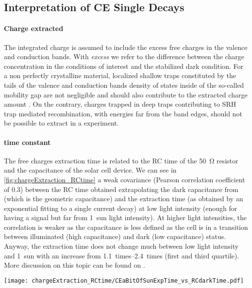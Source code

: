 	\subsection{Interpretation of CE Single Decays}

		\paragraph{Charge extracted}
		The integrated charge is assumed to include the excess free charges in the valence and conduction bands.
		With \emph{excess} we refer to the difference between the charge concentration in the conditions of interest and the stabilized dark condition.
		For a non perfectly crystalline material, localized shallow traps constituted by the tails of the valence and conduction bands density of states inside of the so\hyp{}called mobility gap \cite{Pieters2009} are not negligible and should also contribute to the extracted charge amount \cite{Kirchartz2012,Du2018}.
		On the contrary, charges trapped in deep traps contributing to SRH trap mediated recombination, with energies far from the band edges, should not be possible to extract in a  experiment.

		\paragraph{ time constant}
		The free charges extraction time is related to the RC time of the \SI{50}{\ohm} resistor and the capacitance of the solar cell device.
		We can see in \cref{fig:chargeExtraction_RCtime} a weak covariance (Pearson correlation coefficient of 0.3) between the RC time obtained extrapolating the dark capacitance from  (which is the geometric capacitance) and the extraction time (as obtained by an exponential fitting to a single  current decay) at low light intensity (enough for having a signal but far from 1~sun light intensity).
		At higher light intensities, the correlation is weaker as the capacitance is less defined as the cell is in a transition between illuminated (high capacitance) and dark (low capacitance) status.
		Anyway, the extraction time does not change much between low light intensity and 1~sun with an increase from \SIrange{1.1}{2.4}{times} (first and third quartile).
		More discussion on this topic can be found on .

		\begin{SCfigure}%
			\centering
			\texttt{[image: chargeExtraction\_RCtime/CEaBitOfSunExpTime\_vs\_RCdarkTime.pdf]}
			\label{fig:chargeExtraction_RCtime}
		\end{SCfigure}

